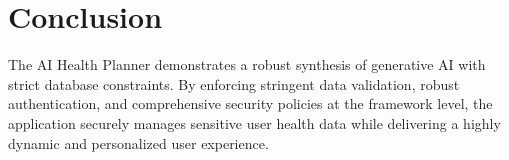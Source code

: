 \documentclass[12pt,a4paper]{article}
\begin{document}
\section{Conclusion}
The AI Health Planner demonstrates a robust synthesis of generative AI with strict database constraints. By enforcing stringent data validation, robust authentication, and comprehensive security policies at the framework level, the application securely manages sensitive user health data while delivering a highly dynamic and personalized user experience.
\end{document}
